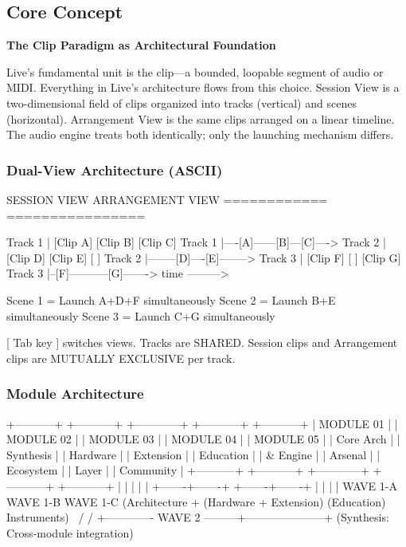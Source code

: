 \documentclass[11pt,letterpaper]{article}
\begin{document}
\subsection{Core Concept}

\textbf{The Clip Paradigm as Architectural Foundation}

Live's fundamental unit is the clip---a bounded, loopable segment of audio or MIDI. Everything
in Live's architecture flows from this choice. Session View is a two-dimensional field of clips
organized into tracks (vertical) and scenes (horizontal). Arrangement View is the same clips
arranged on a linear timeline. The audio engine treats both identically; only the launching
mechanism differs.

\subsubsection{Dual-View Architecture (ASCII)}

\begin{asciibox}
SESSION VIEW                          ARRANGEMENT VIEW
============                          ================

Track 1 | [Clip A] [Clip B] [Clip C]  Track 1 |----[A]------[B]---[C]---->
Track 2 | [Clip D] [Clip E] [   ]     Track 2 |--------[D]----[E]-------->
Track 3 | [Clip F] [   ]   [Clip G]   Track 3 |--[F]-----------[G]------->
                                                         time --------->

Scene 1 = Launch A+D+F simultaneously
Scene 2 = Launch B+E simultaneously
Scene 3 = Launch C+G simultaneously

[ Tab key ] switches views. Tracks are SHARED.
Session clips and Arrangement clips are MUTUALLY EXCLUSIVE per track.
\end{asciibox}

\subsubsection{Module Architecture}

\begin{asciibox}
  +-----------+   +-----------+   +------------+   +-----------+   +-----------+
  | MODULE 01 |   | MODULE 02 |   | MODULE 03  |   | MODULE 04 |   | MODULE 05 |
  | Core Arch |   | Synthesis |   | Hardware   |   | Extension |   | Education |
  | & Engine  |   | Arsenal   |   | Ecosystem  |   | Layer     |   | Community |
  +-----------+   +-----------+   +------------+   +-----------+   +-----------+
       |               |               |               |               |
       +-------+-------+               +-------+-------+               |
               |                               |                       |
         WAVE 1-A                         WAVE 1-B                 WAVE 1-C
    (Architecture +               (Hardware + Extension)        (Education)
      Instruments)
               \                               /                       /
                +------------- WAVE 2 ---------+---------------------+
                               (Synthesis: Cross-module integration)
\end{asciibox}
\end{document}
